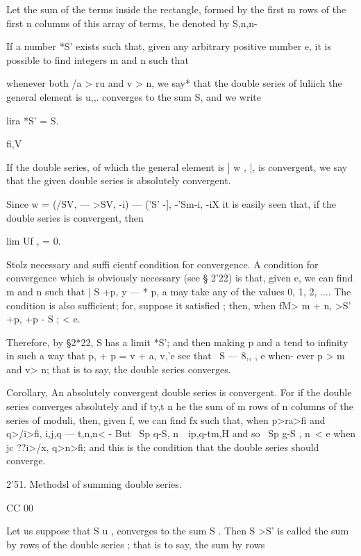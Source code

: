 Let the sum of the terms inside the rectangle, formed by the first 
m rows of the first n columns of this array of terms, be denoted by S,n,n- 

If a number *S' exists such that, given any arbitrary positive number e, it 
is possible to find integers m and n such that 

whenever both /a > ru and v > n, we say* that the double series of luliich the 
general element is u,,.  converges to the sum S, and we write 

lira *S'   = S. 



 fi,V 



If the double series, of which the general element is ] w ,  |, is convergent, 
we say that the given double series is absolutely convergent. 

Since w    = (/SV,  — >SV, -i) — ('S' -], -'Sm-i, -iX it is easily seen that, if 
the double series is convergent, then 

lim Uf , = 0. 

Stolz necessary and suffi cientf condition for convergence. A condition for 
convergence which is obviously necessary (see § 2'22) is that, given e, we can 
find m and n such that | S +p, y  — *%
p, a may take any of the values 0, 1, 2, .... The condition is also sufficient; 
for, suppose it satisfied ; then, when fM> m + n, >S' +p, +p - S   ; < e. 

Therefore, by §2*22, S   has a limit *S'; and then making p and a tend to 
infinity in such a way that p, + p = v + a, v,'e see that \ S — 8,, ,   e when- 
ever p > m and v> n; that is to say, the double series converges. 

Corollary, An absolutely convergent double series is convergent. For if the double 
series converges absolutely and if ty,t n he the sum of m rows of n columns of the series of 
moduli, then, given f, we can find fx such that, when p>ra>fi and q>/i>fi, i,j,q — t,n,n< - 
But \ Sp q-S,  n\ \  ip,q-tm,H and so \ Sp g-S , n\ < e when jc ??i>/x, q>n>fi; and this 
is the condition that the double series should converge. 

2'51. Methodsl of summing double series. 

CC 00 

Let us suppose that S u  , converges to the sum S . Then S >S'  is 
called the sum by rows of the double series ; that is to say, the sum by rows 

